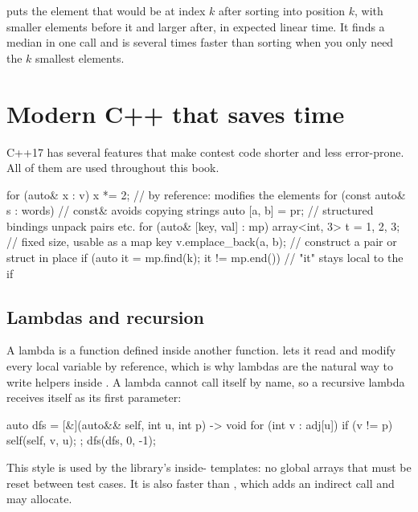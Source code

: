 \begin{trick}
 puts the element that would be at index $k$ after sorting into position
$k$, with smaller elements before it and larger after, in expected linear time. It finds a median in one call and is several
times faster than sorting when you only need the $k$ smallest elements.
\end{trick}

\section[Modern C++ that saves time]{Modern C++ that saves time \hfill \silver}\label{sec:modern}

C++17 has several features that make contest code shorter and less error-prone. All of them are used throughout this book.

\begin{code}
for (auto& x : v) x *= 2;              // by reference: modifies the elements
for (const auto& s : words) { }        // const& avoids copying strings
auto [a, b] = pr;                      // structured bindings unpack pairs etc.
for (auto& [key, val] : mp) { }
array<int, 3> t = {1, 2, 3};           // fixed size, usable as a map key
v.emplace_back(a, b);                  // construct a pair or struct in place
if (auto it = mp.find(k); it != mp.end()) { }  // "it" stays local to the if
\end{code}

\subsection{Lambdas and recursion}

A lambda is a function defined inside another function. \cc{[&]} lets it read and modify every local variable by reference,
which is why lambdas are the natural way to write helpers inside . A lambda cannot call itself by name, so a
recursive lambda receives itself as its first parameter:

\begin{code}
auto dfs = [&](auto&& self, int u, int p) -> void {
    for (int v : adj[u])
        if (v != p) self(self, v, u);
};
dfs(dfs, 0, -1);
\end{code}

This style is used by the library's inside- templates: no global arrays that must be reset between test cases.
It is also faster than , which adds an indirect call and may allocate.


